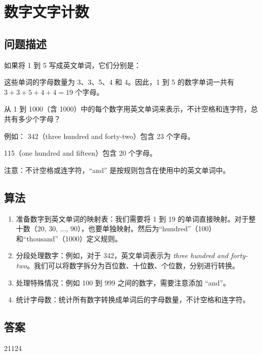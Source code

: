 \section{数字文字计数}
\subsection{问题描述}
\begin{tcolorbox}
	如果将 1 到 5 写成英文单词，它们分别是：

	\begin{itemize}
	\end{itemize}
	这些单词的字母数量为 3、3、5、4 和 4。因此，1 到 5 的数字单词一共有
	$ 3 + 3 + 5 + 4 + 4 = 19 $
	个字母。

	从 1 到 1000（含 1000）中的每个数字用英文单词来表示，不计空格和连字符，总共有多少个字母？

	例如：
	342（three hundred and forty-two）包含 23 个字母。

	115（one hundred and fifteen）包含 20 个字母。

	注意：不计空格或连字符，\enquote{and} 是按规则包含在使用中的英文单词中。
\end{tcolorbox}

\subsection{算法}
\begin{enumerate}
	\item 准备数字到英文单词的映射表：我们需要将 1 到 19 的单词直接映射。对于整十数（20, 30, ...,
		90），也要单独映射。然后为\enquote{hundred}（100）和\enquote{thousand}（1000）定义规则。
	\item 分段处理数字：例如，对于 342，英文单词表示为 \textit{three hundred and forty-two}。我们可以将数字拆分为百位数、十位数、个位数，分别进行转换。
	\item 处理特殊情况：例如 100 到 999 之间的数字，需要注意添加 \enquote{and}。
	\item 统计字母数：统计所有数字转换成单词后的字母数量，不计空格和连字符。
\end{enumerate}

\subsection{答案}
21124
